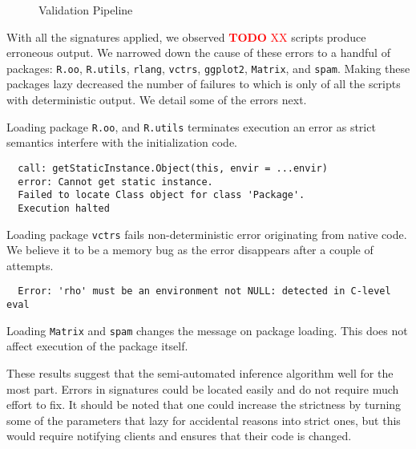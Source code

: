 \documentclass[review,creen,acmsmall]{acmart}
\newcommand{\authorcomment}[3]{\xspace\textcolor{#1}{{\bf #2} #3}\xspace}
\newcommand{\todo}[1]{\authorcomment{red}{TODO}{#1}}
\newcommand{\code}[1]{\lstinline |#1|\xspace}
\begin{document}
\begin{figure}[H]
{
  }
  \caption{Validation Pipeline}\label{fig:validationPipeline}
\end{figure}


With all the signatures applied, we observed \todo{XX} scripts produce erroneous
output. We narrowed down the cause of these errors to a handful of packages:
\code{R.oo}, \code{R.utils}, \code{rlang}, \code{vctrs}, \code{ggplot2},
\code{Matrix}, and \code{spam}. Making these packages lazy decreased the number
of failures to \ValidationStrictFailedProgramCount which is only
\ValidationStrictFailedProgramPerc of all the scripts with deterministic output.
We detail some of the errors next.

Loading package \code{R.oo}, and \code{R.utils} terminates execution an error as
strict semantics interfere with the initialization code.

\begin{verbatim}
  call: getStaticInstance.Object(this, envir = ...envir)
  error: Cannot get static instance.
  Failed to locate Class object for class 'Package'.
  Execution halted
\end{verbatim}

Loading package \code{vctrs} fails non-deterministic error originating from
native code. We believe it to be a memory bug as the error disappears after
a couple of attempts.

\begin{verbatim}
  Error: 'rho' must be an environment not NULL: detected in C-level eval
\end{verbatim}

Loading \code{Matrix} and \code{spam} changes the message on package loading.
This does not affect execution of the package itself.

These results suggest that the semi-automated inference algorithm well for the
most part. Errors in signatures could be located easily and do not require much
effort to fix. It should be noted that one could increase the strictness by
turning some of the parameters that lazy for accidental reasons into strict
ones, but this would require notifying clients and ensures that their code is
changed.
\end{document}
